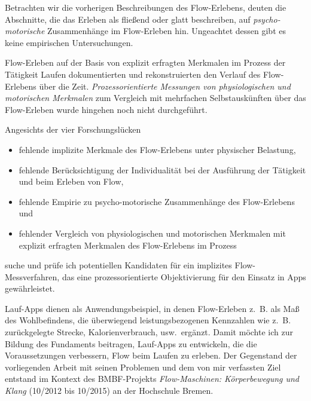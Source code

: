 Betrachten wir die vorherigen Beschreibungen des Flow-Erlebens, deuten die Abschnitte, die das Erleben als fließend oder glatt beschreiben, auf \emph{psycho-motorische} Zusammenhänge im Flow-Erleben hin. Ungeachtet dessen gibt es keine empirischen Untersuchungen.

Flow-Erleben auf der Basis von explizit erfragten Merkmalen im Prozess der Tätigkeit Laufen dokumentierten \citet{Reinhardt2006, Schuler2009} und rekonstruierten den Verlauf des Flow-Erlebens über die Zeit. \emph{Prozessorientierte Messungen von physiologischen und motorischen Merkmalen} zum Vergleich mit mehrfachen Selbstauskünften über das Flow-Erleben wurde hingehen noch nicht durchgeführt.

Angesichts der vier Forschungslücken 
\begin{itemize}
	
	\item fehlende implizite Merkmale des Flow-Erlebens unter physischer Belastung,
	
	\item fehlende Berücksichtigung der Individualität bei der Ausführung der Tätigkeit und beim Erleben von Flow,
	
	\item fehlende Empirie zu psycho-motorische Zusammenhänge des Flow-Erlebens und
	
	\item fehlender Vergleich von physiologischen und motorischen Merkmalen mit explizit erfragten Merkmalen des Flow-Erlebens im Prozess 
\end{itemize}
suche und prüfe ich potentiellen Kandidaten für ein implizites Flow-Messverfahren, das eine prozessorientierte Objektivierung für den Einsatz in Apps gewährleistet. 

Lauf-Apps dienen als Anwendungsbeispiel, in denen Flow-Erleben z.~B. als Maß des Wohlbefindens, die überwiegend leistungsbezogenen Kennzahlen wie z.~B. zurückgelegte Strecke, Kalorienverbrauch, usw.\ ergänzt. Damit möchte ich zur Bildung des Fundaments beitragen, Lauf-Apps zu entwickeln, die die Voraussetzungen verbessern, Flow beim Laufen zu erleben. Der Gegenstand der vorliegenden Arbeit mit seinen Problemen und dem von mir verfassten Ziel entstand im Kontext des \acs{BMBF}-Projekts \emph{Flow-Maschinen: Körperbewegung und Klang} (10/2012 bis 10/2015) an der Hochschule Bremen.

